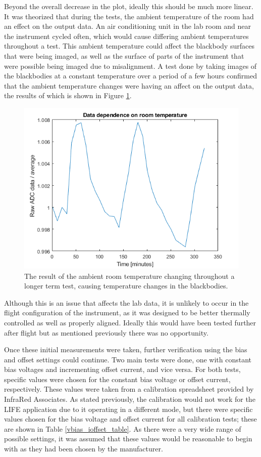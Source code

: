 Beyond the overall decrease in the plot, ideally this should be much more linear. It was theorized that during the tests, the ambient temperature of the room had an effect on the output data. An air conditioning unit in the lab room and near the instrument cycled often, which would cause differing ambient temperatures throughout a test. This ambient temperature could affect the blackbody surfaces that were being imaged, as well as the surface of parts of the instrument that were possible being imaged due to misalignment. A test done by taking images of the blackbodies at a constant temperature over a period of a few hours confirmed that the ambient temperature changes were having an affect on the output data, the results of which is shown in Figure \ref{fig:ADC_dep_on_room_temp}.

\begin{figure}[h]
  \centering
  \includegraphics[width=0.8\linewidth]{chap5_images/DC_dep_on_room_temp.png}
  \caption{The result of the ambient room temperature changing throughout a longer term test, causing temperature changes in the blackbodies.}
  \label{fig:ADC_dep_on_room_temp}
\end{figure}

Although this is an issue that affects the lab data, it is unlikely to occur in the flight configuration of the instrument, as it was designed to be better thermally controlled as well as properly aligned. Ideally this would have been tested further after flight but as mentioned previously there was no opportunity. 

Once these initial measurements were taken, further verification using the bias and offset settings could continue. Two main tests were done, one with constant bias voltages and incrementing offset current, and vice versa. For both tests, specific values were chosen for the constant bias voltage or offset current, respectively. These values were taken from a calibration spreadsheet provided by InfraRed Associates. As stated previously, the calibration would not work for the LIFE application due to it operating in a different mode, but there were specific values chosen for the bias voltage and offset current for all calibration tests; these are shown in Table \ref{vbias_ioffset_table}. As there were a very wide range of possible settings, it was assumed that these values would be reasonable to begin with as they had been chosen by the manufacturer. 

